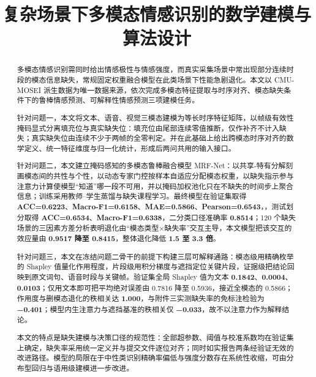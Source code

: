 \documentclass[withoutpreface,bwprint]{cumcmthesis}
\title{复杂场景下多模态情感识别的数学建模与算法设计}
\begin{document}
\maketitle

\begin{abstract}
多模态情感识别需同时给出情感极性与情感强度，而真实采集场景中常出现部分连续时段的模态信息缺失，常规固定权重融合模型在此类场景下性能急剧退化。本文以 CMU-MOSEI 派生数据为唯一数据来源，依次完成多模态特征提取与时序对齐、模态缺失条件下的鲁棒情感预测、可解释性情感预测三项建模任务。

针对问题一，本文将文本、语音、视觉三模态建模为等长时序特征矩阵，以帧级有效性掩码显式分离填充位与真实缺失位：填充位由尾部连续零值推断，仅作补齐不计入缺失；真实缺失位由连续不少于两帧的全零判定。并在此基础上给出跨模态时序对齐的数学定义、统一特征维度与归一化统计，形成后两问共用的输入接口。

针对问题二，本文建立掩码感知的多模态鲁棒融合模型 MRF-Net：以共享-特有分解刻画模态间的共性与个性，以动态专家门控按样本自适应分配模态权重，以缺失指示参与注意力计算使模型“知道”哪一段不可用，并以掩码加权池化只在不缺失的时间步上聚合信息；训练采用教师--学生蒸馏与缺失课程学习。最终模型在验证集取得 \textbf{ACC=0.6223}、\textbf{Macro-F1=0.6158}、\textbf{MAE=0.5866}、\textbf{Pearson=0.6543}，，测试划分取得 \textbf{ACC=0.6534}、\textbf{Macro-F1=0.6338}，二分类口径准确率 \textbf{0.8514}；120 个缺失场景的三因素方差分析表明退化由“模态类型×缺失率”交互主导，本文模型把该交互的效应量由 \textbf{0.9517 降至 0.8415}，整体退化降低 \textbf{1.5 至 3.3 倍}。

针对问题三，本文在冻结问题二骨干的前提下构建三层可解释通路：模态级用精确枚举的 Shapley 值量化作用程度，片段级用积分梯度与遮挡定位关键片段，证据级把结论回映到原文词句、语音时段与关键帧。验证集全局 Shapley 值为文本 \textbf{0.1842}、\textbf{0.0004}、\textbf{0.0103}；仅用文本即可把平均绝对误差由 0.7816 降至 0.5936，接近全模态的 0.5866；作用度与删模态退化的秩相关达 \textbf{1.000}，与附件三实测缺失率的免标注检验为 \textbf{−0.401}；模型内生注意力与遮挡基准的秩相关仅 \textbf{−0.033}，故不以注意力作为解释结论。

本文的特点是缺失建模与决策口径的规范性：全部超参数、阈值与校准系数均在验证集上确定，缺失率采用统一定义并与提交文件逐位对齐；同时如实报告两条经验证无效的改进路径。模型的局限在于中性类识别精确率偏低与强度分数存在系统性收缩，可由分布型回归与语用级建模进一步改进。
\end{abstract}
\end{document}
